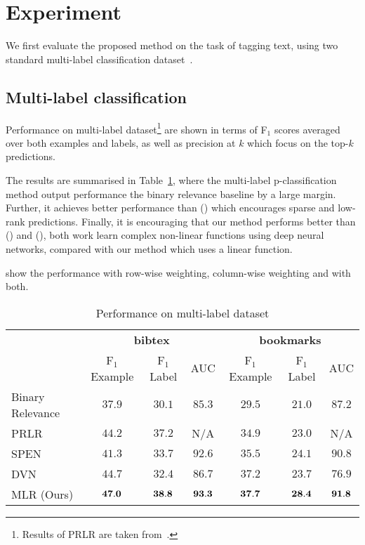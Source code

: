 \clearpage
\newpage

\section{Experiment}
\label{sec:experiment}

We first evaluate the proposed method on the task of tagging text, 
using two standard multi-label classification dataset~\cite{katakis2008multilabel}.

\subsection{Multi-label classification}

Performance on multi-label dataset\footnote{Results of PRLR are taken from~\cite{lin2014multi}.}
are shown in terms of F$_1$ scores averaged over both examples and labels, 
as well as precision at $k$ which focus on the top-$k$ predictions.

The results are summarised in Table~\ref{tab:perf_mlc},
where the multi-label p-classification method output performance the binary relevance baseline by a large margin.
Further, it achieves better performance than (\cite{lin2014multi}) which encourages sparse and low-rank predictions.
Finally, it is encouraging that our method performs better than (\cite{belanger2016structured}) and (\cite{gygli2017deep}),
both work learn complex non-linear functions using deep neural networks, compared with our method which uses a linear function.

\TODO show the performance with row-wise weighting, column-wise weighting and with both.

\begin{table}[!h]
\centering
\caption{Performance on multi-label dataset}
\label{tab:perf_mlc}
\setlength{\tabcolsep}{2pt} %
\begin{tabular}{l|ccc|ccc}
\toprule
{} & \multicolumn{3}{c|}{\textbf{bibtex}} & \multicolumn{3}{c}{\textbf{bookmarks}} \\
{} &   F$_1$ Example & F$_1$ Label &    AUC &      F$_1$ Example & F$_1$ Label &    AUC \\
\midrule
Binary Relevance~\cite{}           &          $37.9$ &      $30.1$ & $85.3$ &             $29.5$ &      $21.0$ & $87.2$ \\
PRLR~\cite{lin2014multi}           &          $44.2$ &      $37.2$ &    N/A &             $34.9$ &      $23.0$ &    N/A \\
SPEN~\cite{belanger2016structured} &          $41.3$ &      $33.7$ & $92.6$ &             $35.5$ &      $24.1$ & $90.8$ \\
DVN~\cite{gygli2017deep}           &          $44.7$ &      $32.4$ & $86.7$ &             $37.2$ &      $23.7$ & $76.9$ \\
MLR (Ours)                         &          ${\bf 47.0}$ & ${\bf 38.8}$ & ${\bf 93.3}$ & ${\bf 37.7}$ & ${\bf 28.4}$ & ${\bf 91.8}$ \\
\bottomrule
\end{tabular}
\end{table}



